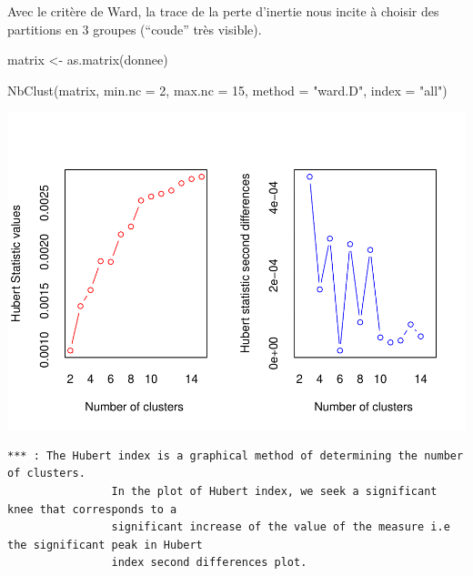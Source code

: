 \documentclass[
]{article}
\newenvironment{Shaded}{}{}
\newcommand{\AttributeTok}[1]{#1}
\newcommand{\DecValTok}[1]{#1}
\newcommand{\FunctionTok}[1]{#1}
\newcommand{\NormalTok}[1]{#1}
\newcommand{\OtherTok}[1]{\textcolor[rgb]{1.00,0.25,0.00}{#1}}
\newcommand{\StringTok}[1]{\textcolor[rgb]{0.00,0.50,0.50}{#1}}
\begin{document}
Avec le critère de Ward, la trace de la perte d'inertie nous incite à
choisir des partitions en 3 groupes (``coude'' très visible).

\begin{Shaded}
\begin{Highlighting}[]
\NormalTok{matrix }\OtherTok{\textless{}{-}} \FunctionTok{as.matrix}\NormalTok{(donnee)}
\end{Highlighting}
\end{Shaded}

\begin{Shaded}
\begin{Highlighting}[]
\FunctionTok{NbClust}\NormalTok{(matrix, }\AttributeTok{min.nc =} \DecValTok{2}\NormalTok{, }\AttributeTok{max.nc =} \DecValTok{15}\NormalTok{, }\AttributeTok{method =} \StringTok{"ward.D"}\NormalTok{, }\AttributeTok{index =} \StringTok{"all"}\NormalTok{)}
\end{Highlighting}
\end{Shaded}

\includegraphics{Projet_files/figure-latex/unnamed-chunk-19-1.pdf}

\begin{verbatim}
*** : The Hubert index is a graphical method of determining the number of clusters.
                In the plot of Hubert index, we seek a significant knee that corresponds to a 
                significant increase of the value of the measure i.e the significant peak in Hubert
                index second differences plot. 
 
\end{verbatim}
\end{document}
